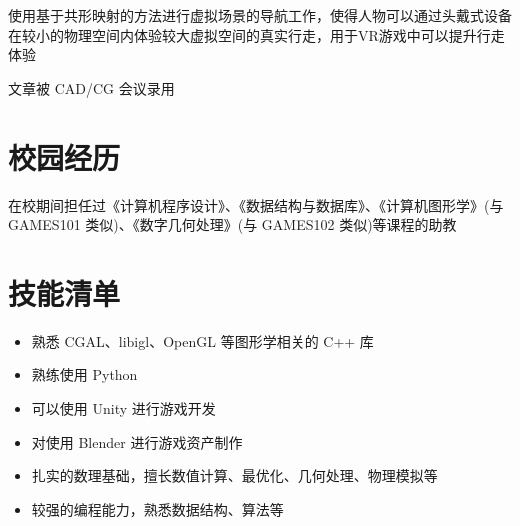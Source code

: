 \documentclass{resume}
\begin{document}
使用基于共形映射的方法进行虚拟场景的导航工作，使得人物可以通过头戴式设备在较小的物理空间内体验较大虚拟空间的真实行走，用于VR游戏中可以提升行走体验

文章被 CAD/CG 会议录用

\section{校园经历}
在校期间担任过《计算机程序设计》、《数据结构与数据库》、《计算机图形学》(与 GAMES101 类似)、《数字几何处理》(与 GAMES102 类似)等课程的助教

\section{技能清单}
\begin{itemize}[parsep=0.5ex]
  \item 熟悉 CGAL、libigl、OpenGL 等图形学相关的 C++ 库
  \item 熟练使用 Python
  \item 可以使用 Unity 进行游戏开发
  \item 对使用 Blender 进行游戏资产制作 
  \item 扎实的数理基础，擅长数值计算、最优化、几何处理、物理模拟等
  \item 较强的编程能力，熟悉数据结构、算法等
\end{itemize}
\end{document}
